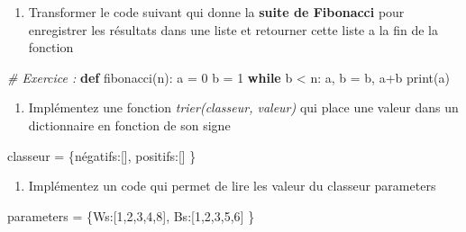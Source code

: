 \documentclass[11pt]{article}
\providecommand{\tightlist}{%
      \setlength{\itemsep}{0pt}\setlength{\parskip}{0pt}}
\newenvironment{Shaded}{}{}
\newcommand{\KeywordTok}[1]{\textcolor[rgb]{0.00,0.44,0.13}{\textbf{{#1}}}}
\newcommand{\DecValTok}[1]{\textcolor[rgb]{0.25,0.63,0.44}{{#1}}}
\newcommand{\StringTok}[1]{\textcolor[rgb]{0.25,0.44,0.63}{{#1}}}
\newcommand{\CommentTok}[1]{\textcolor[rgb]{0.38,0.63,0.69}{\textit{{#1}}}}
\newcommand{\NormalTok}[1]{{#1}}
\newcommand{\ControlFlowTok}[1]{\textcolor[rgb]{0.00,0.44,0.13}{\textbf{{#1}}}}
\newcommand{\OperatorTok}[1]{\textcolor[rgb]{0.40,0.40,0.40}{{#1}}}
\newcommand{\BuiltInTok}[1]{{#1}}
\begin{document}
\begin{enumerate}
\def\labelenumi{\arabic{enumi}.}
\tightlist
\item
  Transformer le code suivant qui donne la \textbf{suite de Fibonacci}
  pour enregistrer les résultats dans une liste et retourner cette liste
  a la fin de la fonction
\end{enumerate}

\begin{Shaded}
\begin{Highlighting}[]
\CommentTok{\# Exercice :}
\KeywordTok{def}\NormalTok{ fibonacci(n):}
\NormalTok{    a }\OperatorTok{=} \DecValTok{0}
\NormalTok{    b }\OperatorTok{=} \DecValTok{1}
    \ControlFlowTok{while}\NormalTok{ b }\OperatorTok{\textless{}}\NormalTok{ n:}
\NormalTok{      a, b }\OperatorTok{=}\NormalTok{ b, a}\OperatorTok{+}\NormalTok{b}
      \BuiltInTok{print}\NormalTok{(a)}
\end{Highlighting}
\end{Shaded}

\begin{enumerate}
\def\labelenumi{\arabic{enumi}.}
\setcounter{enumi}{1}
\tightlist
\item
  Implémentez une fonction \emph{trier(classeur, valeur)} qui place une
  valeur dans un dictionnaire en fonction de son signe
\end{enumerate}

\begin{Shaded}
\begin{Highlighting}[]
\NormalTok{classeur }\OperatorTok{=}\NormalTok{ \{}\StringTok{\textquotesingle{}négatifs\textquotesingle{}}\NormalTok{:[],}
            \StringTok{\textquotesingle{}positifs\textquotesingle{}}\NormalTok{:[]}
\NormalTok{            \}}
\end{Highlighting}
\end{Shaded}

\begin{enumerate}
\def\labelenumi{\arabic{enumi}.}
\setcounter{enumi}{2}
\tightlist
\item
  Implémentez un code qui permet de lire les valeur du classeur
  parameters
\end{enumerate}

\begin{Shaded}
\begin{Highlighting}[]
\NormalTok{parameters }\OperatorTok{=}\NormalTok{ \{}\StringTok{\textquotesingle{}Ws\textquotesingle{}}\NormalTok{:[}\DecValTok{1}\NormalTok{,}\DecValTok{2}\NormalTok{,}\DecValTok{3}\NormalTok{,}\DecValTok{4}\NormalTok{,}\DecValTok{8}\NormalTok{],}
            \StringTok{\textquotesingle{}Bs\textquotesingle{}}\NormalTok{:[}\DecValTok{1}\NormalTok{,}\DecValTok{2}\NormalTok{,}\DecValTok{3}\NormalTok{,}\DecValTok{5}\NormalTok{,}\DecValTok{6}\NormalTok{]}
\NormalTok{            \}}
\end{Highlighting}
\end{Shaded}
\end{document}
